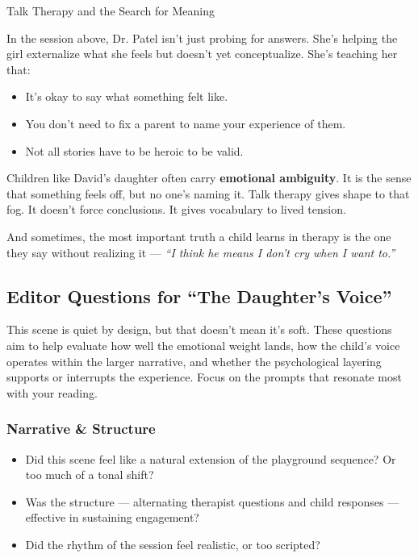 \begin{PsychologicalSidebar}{Talk Therapy and the Search for Meaning}
  \medskip
  
  In the session above, Dr. Patel isn’t just probing for answers. She’s helping the girl externalize 
  what she feels but doesn’t yet conceptualize.  
  She’s teaching her that:

  \medskip
  
  \begin{itemize}
    \item It’s okay to say what something felt like.
    \item You don’t need to fix a parent to name your experience of them.
    \item Not all stories have to be heroic to be valid.
  \end{itemize}
  
  \medskip
  
  Children like David’s daughter often carry \textbf{emotional ambiguity}. It is the sense that 
  something feels off, but no one’s naming it. Talk therapy gives shape to that fog. It doesn’t 
  force conclusions. It gives vocabulary to lived tension.

  \medskip
  
  And sometimes, the most important truth a child learns in therapy is the one they say without 
  realizing it — \textit{``I think he means I don’t cry when I want to.''}
  
\end{PsychologicalSidebar}

  
\subsection*{Editor Questions for ``The Daughter’s Voice''}

This scene is quiet by design, but that doesn't mean it's soft. These questions aim to help evaluate how well the emotional weight lands, how the child’s voice operates within the larger narrative, and whether the psychological layering supports or interrupts the experience. Focus on the prompts that resonate most with your reading.

\subsubsection*{Narrative \& Structure}

\begin{itemize}
  \item Did this scene feel like a natural extension of the playground sequence? Or too much of a tonal shift?
  \item Was the structure — alternating therapist questions and child responses — effective in sustaining engagement?
  \item Did the rhythm of the session feel realistic, or too scripted?
\end{itemize}

